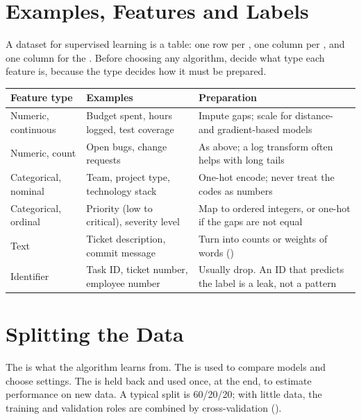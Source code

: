 \section{Examples, Features and Labels}

A dataset for supervised learning is a table: one row per , one
column per , and one column for the . Before choosing
any algorithm, decide what type each feature is, because the type decides how
it must be prepared.

\begin{longtable}{@{}L{3.0cm}L{5.0cm}L{7.0cm}@{}}
\toprule
{}
\textbf{Feature type} & \textbf{Examples} & \textbf{Preparation} \\
\midrule
\endhead
Numeric, continuous & Budget spent, hours logged, test coverage & Impute gaps;
scale for distance- and gradient-based models \\
Numeric, count & Open bugs, change requests & As above; a log transform often
helps with long tails \\
Categorical, nominal & Team, project type, technology stack & One-hot encode;
never treat the codes as numbers \\
Categorical, ordinal & Priority (low to critical), severity level & Map to ordered
integers, or one-hot if the gaps are not equal \\
Text & Ticket description, commit message & Turn into counts or weights of words
() \\
Identifier & Task ID, ticket number, employee number & Usually drop. An ID that
predicts the label is a leak, not a pattern \\
\bottomrule
\end{longtable}

\section{Splitting the Data}

\begin{definitionbox}
The  is what the algorithm learns from. The  is used to compare models and choose settings. The  is held
back and used once, at the end, to estimate performance on new data. A typical
split is 60/20/20; with little data, the training and validation roles are
combined by cross-validation ().
\end{definitionbox}

